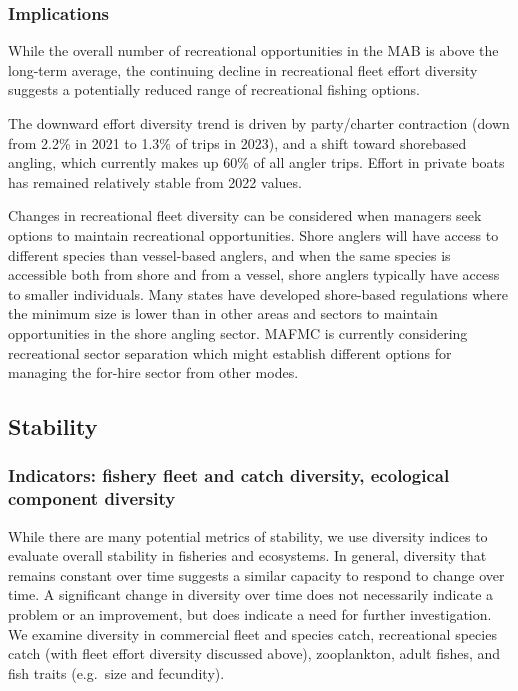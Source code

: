 \documentclass[
  10pt,
]{article}
\begin{document}
\subsubsection{Implications}\label{implications-2}

While the overall number of recreational opportunities in the MAB is above the long-term average, the continuing decline in recreational fleet effort diversity suggests a potentially reduced range of recreational fishing options.

The downward effort diversity trend is driven by party/charter contraction (down from 2.2\% in 2021 to 1.3\% of trips in 2023), and a shift toward shorebased angling, which currently makes up 60\% of all angler trips. Effort in private boats has remained relatively stable from 2022 values.

Changes in recreational fleet diversity can be considered when managers seek options to maintain recreational opportunities. Shore anglers will have access to different species than vessel-based anglers, and when the same species is accessible both from shore and from a vessel, shore anglers typically have access to smaller individuals. Many states have developed shore-based regulations where the minimum size is lower than in other areas and sectors to maintain opportunities in the shore angling sector. MAFMC is currently considering recreational sector separation which might establish different options for managing the for-hire sector from other modes.

\subsection{Stability}\label{stability}

\subsubsection{Indicators: fishery fleet and catch diversity, ecological component diversity}\label{indicators-fishery-fleet-and-catch-diversity-ecological-component-diversity}

While there are many potential metrics of stability, we use diversity indices to evaluate overall stability in fisheries and ecosystems. In general, diversity that remains constant over time suggests a similar capacity to respond to change over time. A significant change in diversity over time does not necessarily indicate a problem or an improvement, but does indicate a need for further investigation. We examine diversity in commercial fleet and species catch, recreational species catch (with fleet effort diversity discussed above), zooplankton, adult fishes, and fish traits (e.g.~size and fecundity).
\end{document}
